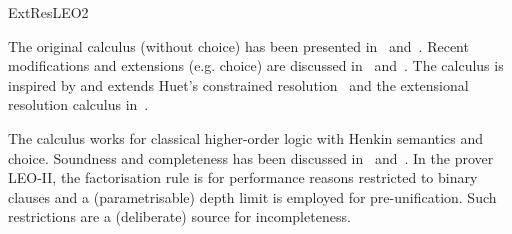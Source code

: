 \begin{entry}{ExtResLEO2}
 \begin{history}
The original calculus (without choice) has been presented in~\cite{C5}
and~\cite{J5}. Recent modifications and extensions (e.g. choice) are discussed
in~\cite{W47} and~\cite{EasyChair:215}.
The calculus is inspired by and extends Huet's constrained
resolution~\cite{Huet:amott73,Huet:cracmfhol72} and the extensional resolution
calculus in~\cite{C2}.
 \end{history}

\begin{technicalities} 
The calculus works for classical higher-order logic with Henkin semantics and
choice. Soundness and completeness has been discussed in~\cite{C5}
and~\cite{J5}. In the prover LEO-II, the factorisation rule is for performance
reasons restricted to binary clauses and a (parametrisable) depth limit is
employed for pre-unification. Such restrictions are a (deliberate) source for
incompleteness.  
\end{technicalities}

\end{entry}
